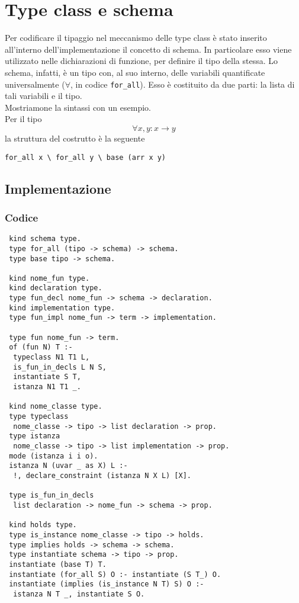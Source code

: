 \documentclass[12pt,a4paper,openright,twoside]{report}
\begin{document}
\section{Type class e schema}
Per codificare il tipaggio nel meccanismo delle type class è stato inserito all'interno dell'implementazione il concetto di schema. In particolare esso viene utilizzato nelle dichiarazioni di funzione, per definire il tipo della stessa. Lo schema, infatti, è un tipo con, al suo interno, delle variabili quantificate universalmente ($\forall$, in codice \verb"for_all"). Esso è costituito da due parti: la lista di tali variabili e il tipo.\\
Mostriamone la sintassi con un esempio.\\
Per il tipo
\begin{equation}
 \forall x,y : x \rightarrow y \label{eq:fax->y}
\end{equation}
la struttura del costrutto è la seguente
\begin{center}
 \verb"for_all x \ for_all y \ base (arr x y)"
\end{center}

\subsection{Implementazione}\label{implTypCl}

\subsubsection{Codice}
\begin{verbatim}
 kind schema type.
 type for_all (tipo -> schema) -> schema.
 type base tipo -> schema.
 
 kind nome_fun type.
 kind declaration type.
 type fun_decl nome_fun -> schema -> declaration.
 kind implementation type.
 type fun_impl nome_fun -> term -> implementation.
 
 type fun nome_fun -> term.
 of (fun N) T :-
  typeclass N1 T1 L,
  is_fun_in_decls L N S,
  instantiate S T,
  istanza N1 T1 _.
 
 kind nome_classe type.
 type typeclass
  nome_classe -> tipo -> list declaration -> prop.
 type istanza
  nome_classe -> tipo -> list implementation -> prop.
 mode (istanza i i o).
 istanza N (uvar _ as X) L :-
  !, declare_constraint (istanza N X L) [X].
 
 type is_fun_in_decls
  list declaration -> nome_fun -> schema -> prop.
 
 kind holds type.
 type is_instance nome_classe -> tipo -> holds.
 type implies holds -> schema -> schema.
 type instantiate schema -> tipo -> prop.
 instantiate (base T) T.
 instantiate (for_all S) O :- instantiate (S T_) O.
 instantiate (implies (is_instance N T) S) O :-
  istanza N T _, instantiate S O.
\end{verbatim}
\end{document}
